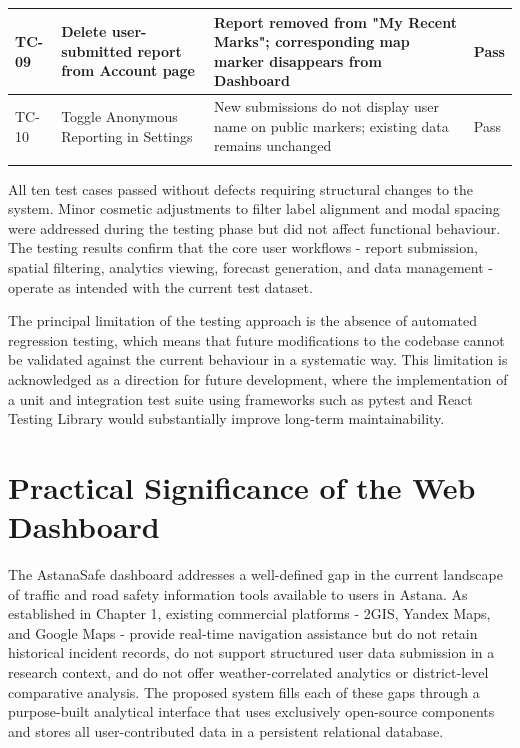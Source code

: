 \documentclass[12pt,a4paper]{report}
\begin{document}
\begin{tabularx}{\textwidth}{|p{1.4cm}
                  |p{4cm}
                  |X
                  |p{1.2cm}|}
    TC-09 & Delete user-submitted report from Account page &
    Report removed from "My Recent Marks"; corresponding map marker disappears from Dashboard &
    Pass \\
    \hline

    TC-10 & Toggle Anonymous Reporting in Settings &
    New submissions do not display user name on public markers; existing data remains unchanged &
    Pass \\
    \hline

  \caption{\centering Manual test cases and results}
  \label{tab:test_cases}
  
\end{tabularx}

All ten test cases passed without defects requiring structural changes to the system. Minor cosmetic adjustments to filter label alignment and modal spacing were addressed during the testing phase but did not affect functional behaviour. The testing results confirm that the core user workflows - report submission, spatial filtering, analytics viewing, forecast generation, and data management - operate as intended with the current test dataset.

The principal limitation of the testing approach is the absence of automated regression testing, which means that future modifications to the codebase cannot be validated against the current behaviour in a systematic way. This limitation is acknowledged as a direction for future development, where the implementation of a unit and integration test suite using frameworks such as pytest and React Testing Library would substantially improve long-term maintainability.

\section{Practical Significance of the Web Dashboard}

The AstanaSafe dashboard addresses a well-defined gap in the current landscape of traffic and road safety information tools available to users in Astana. As established in Chapter 1, existing commercial platforms - 2GIS, Yandex Maps, and Google Maps - provide real-time navigation assistance but do not retain historical incident records, do not support structured user data submission in a research context, and do not offer weather-correlated analytics or district-level comparative analysis. The proposed system fills each of these gaps through a purpose-built analytical interface that uses exclusively open-source components and stores all user-contributed data in a persistent relational database.
\end{document}
